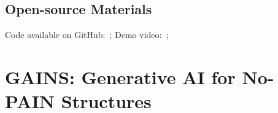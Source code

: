 \subsection*{Open-source Materials}
Code available on GitHub: \,; Demo video: \,;






\section{GAINS: Generative AI for No-PAIN Structures}

